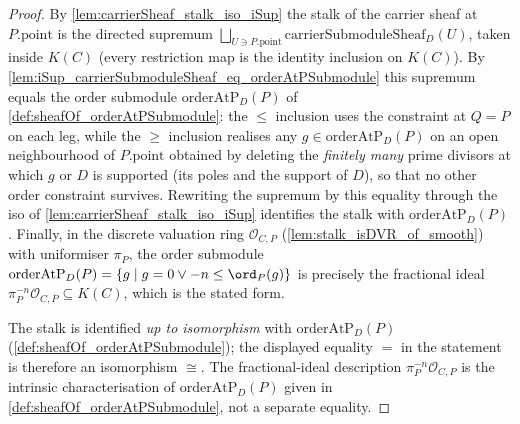 \begin{proof}
  By \cref{lem:carrierSheaf_stalk_iso_iSup} the stalk of the carrier sheaf at
  \(P.\mathrm{point}\) is the directed supremum
  \(\bigsqcup_{U \ni P.\mathrm{point}} \mathrm{carrierSubmoduleSheaf}_D(U)\),
  taken inside \(K(C)\) (every restriction map is the identity inclusion on
  \(K(C)\)). By
  \cref{lem:iSup_carrierSubmoduleSheaf_eq_orderAtPSubmodule} this supremum equals
  the order submodule \(\mathrm{orderAtP}_D(P)\) of
  \cref{def:sheafOf_orderAtPSubmodule}: the \(\le\) inclusion uses the constraint
  at \(Q = P\) on each leg, while the \(\ge\) inclusion realises any
  \(g \in \mathrm{orderAtP}_D(P)\) on an open neighbourhood of \(P.\mathrm{point}\)
  obtained by deleting the \emph{finitely many} prime divisors at which \(g\) or
  \(D\) is supported (its poles and the support of \(D\)), so that no other order
  constraint survives. Rewriting the supremum by this equality through the iso of
  \cref{lem:carrierSheaf_stalk_iso_iSup} identifies the stalk with
  \(\mathrm{orderAtP}_D(P)\). Finally, in the discrete valuation ring
  \(\mathcal O_{C,P}\) (\cref{lem:stalk_isDVR_of_smooth}) with uniformiser
  \(\pi_P\), the order submodule \(\mathrm{orderAtP}_D(P) = \{g \mid g = 0 \lor
  -n \le \ord_P(g)\}\) is precisely the fractional ideal
  \(\pi_P^{-n}\mathcal O_{C,P} \subseteq K(C)\), which is the stated form.

  The stalk is identified \emph{up to isomorphism} with
  \(\mathrm{orderAtP}_D(P)\) (\cref{def:sheafOf_orderAtPSubmodule}); the
  displayed equality \(=\) in the statement is therefore an isomorphism
  \(\cong\). The fractional-ideal description \(\pi_P^{-n}\mathcal O_{C,P}\)
  is the intrinsic characterisation of \(\mathrm{orderAtP}_D(P)\) given in
  \cref{def:sheafOf_orderAtPSubmodule}, not a separate equality.
\end{proof}

